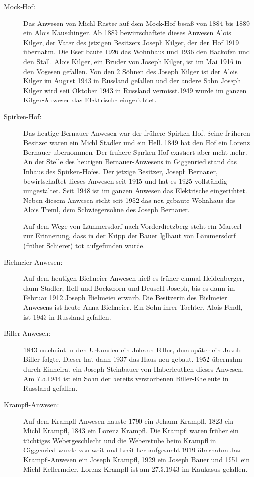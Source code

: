\documentclass[12pt,a4pager]{book}
\begin{document}
\begin{description}
\item[Mock-Hof:] Das Anwesen von Michl Raster auf dem Mock-Hof besaß von 1884
bis 1889 ein Alois Kauschinger. Ab 1889 bewirtschaftete dieses Anwesen Alois
Kilger, der Vater des jetzigen Besitzers Joseph Kilger, der den Hof 1919
übernahm. Die Eser baute 1926 das Wohnhaus und 1936 den Backofen und den Stall.
Alois Kilger, ein Bruder von Joseph Kilger, ist im Mai 1916 in den Vogesen
gefallen. Von den 2 Söhnen des Joseph Kilger ist der Alois Kilger im August 1943
in Russland gefallen und der andere Sohn Joseph Kilger wird seit Oktober 1943 in
Russland vermisst.1949 wurde im ganzen Kilger-Anwesen das Elektrische
eingerichtet.

\item[Spirken-Hof:] Das heutige Bernauer-Anwesen war der frühere Spirken-Hof.
Seine früheren Besitzer waren ein Michl Stadler und ein Hell. 1849 hat den Hof
ein Lorenz Bernauer übernommen. Der frühere Spirken-Hof existiert aber nicht
mehr. An der Stelle des heutigen Bernauer-Anwesens in Giggenried stand das
Inhaus des Spirken-Hofes. Der jetzige Besitzer, Joseph Bernauer, bewirtschaftet
dieses Anwesen seit 1915 und hat es 1925 vollständig umgestaltet. Seit 1948 ist
im ganzen Anwesen das Elektrische eingerichtet. Neben diesem Anwesen steht seit
1952 das neu gebaute Wohnhaus des Alois Treml, dem Schwiegersohne des Joseph
Bernauer.

Auf dem Wege von Lämmersdorf nach Vorderdietzberg steht ein Marterl zur
Erinnerung, dass in der Kripp der Bauer Iglhaut von Lämmersdorf (früher
Schierer) tot aufgefunden wurde.

\item[Bielmeier-Anwesen:] Auf dem heutigen Bielmeier-Anwesen hieß es früher
einmal Heidenberger, dann Stadler, Hell und Bockshorn und Deuschl Joseph, bis es
dann im Februar 1912 Joseph Bielmeier erwarb. Die Besitzerin des Bielmeier
Anwesens ist heute Anna Bielmeier. Ein Sohn ihrer Tochter, Alois Fendl, ist 1943
in Russland gefallen.

\item[Biller-Anwesen:] 1843 erscheint in den Urkunden ein Johann Biller, dem
später ein Jakob Biller folgte. Dieser hat dann 1937 das Haus neu gebaut. 1952
übernahm durch Einheirat ein Joseph Steinbauer von Haberleuthen dieses Anwesen.
Am 7.5.1944 ist ein Sohn der bereits verstorbenen Biller-Eheleute in Russland
gefallen.

\item[Krampfl-Anwesen:] Auf dem Krampfl-Anwesen hauste 1790 ein Johann Krampfl,
1823 ein Michl Krampfl, 1843 ein Lorenz Krampfl. Die Krampfl waren früher ein
tüchtiges Webergeschlecht und die Weberstube beim Krampfl in Giggenried wurde
von weit und breit her aufgesucht.1919 übernahm das Krampfl-Anwesen ein Joseph
Krampfl, 1929 ein Joseph Bauer und 1951 ein Michl Kellermeier. Lorenz Krampfl
ist am 27.5.1943 im Kaukasus gefallen.


\end{description}
\end{document}
